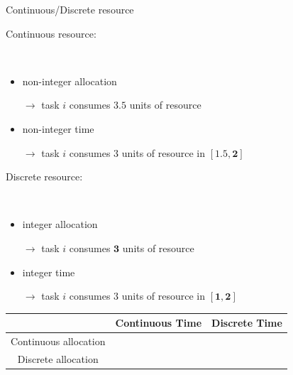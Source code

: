 \begin{frame}{Continuous/Discrete resource} 
  \begin{description}
  \item[Continuous resource:] ~
  \end{description}
  
  \vspace{-0.3cm}
  \begin{itemize}
  \item {\small non-integer \textcolor{blue!80!black!80}{allocation}}

    {\footnotesize $\rightarrow$ task $i$ consumes \textcolor{blue!80!black!80}{$\mathbf{3.5}$} units of resource}
  \item {\small non-integer \textcolor{red!80!black!80}{time } }
    
    {\footnotesize $\rightarrow$ task $i$ consumes $3$ units of resource in \textcolor{red!80!black!80}{$\mathbf{[1.5,2]}$}}
  \end{itemize} 

  \vspace{0.2cm} 
  \begin{description}
  \item[  Discrete resource:] ~
  \end{description}

  \vspace{-0.3cm}
  \begin{itemize}
  \item {\small integer \textcolor{blue!80!black!80}{allocation }}

    {\footnotesize $\rightarrow$ task $i$ consumes \textcolor{blue!80!black!80}{$\mathbf{3}$} units of resource}
  \item {\small integer \textcolor{red!80!black!80}{time }}

    {\footnotesize $\rightarrow$ task $i$ consumes $3$ units of resource in \textcolor{red!80!black!80}{$\mathbf{[1,2]}$}}
  \end{itemize}

  \vspace{0.2cm} 
  \begin{center}
    {\footnotesize
      \begin{tabular}{|c|c|c|}
        \hline
        & Continuous Time & Discrete Time\\
        \hline
        Continuous allocation & \cellcolor{blue!80!black!80}&   \cellcolor{blue!50!black!20}\\
        \hline
        Discrete allocation & &  \cellcolor{blue!50!black!20}\\
        \hline
      \end{tabular}}
  \end{center}
\end{frame}


